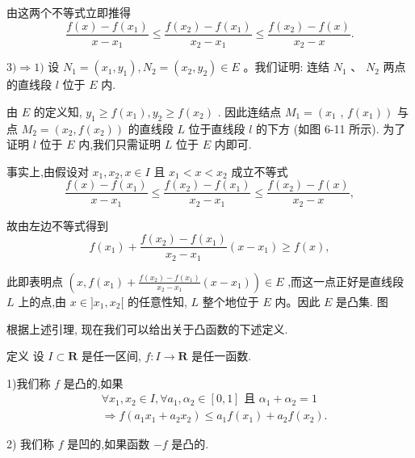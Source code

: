 由这两个不等式立即推得
$$\frac{f\left( x\right)  - f\left( {x}_{1}\right) }{x - {x}_{1}} \leq  \frac{f\left( {x}_{2}\right)  - f\left( {x}_{1}\right) }{{x}_{2} - {x}_{1}} \leq  \frac{f\left( {x}_{2}\right)  - f\left( x\right) }{{x}_{2} - x}.$$

$3) \Rightarrow  1)$ 设 ${N}_{1} = \left( {{x}_{1},{y}_{1}}\right) ,{N}_{2} = \left( {{x}_{2},{y}_{2}}\right)  \in  E$ 。我们证明: 连结 ${N}_{1}\text{ 、 }{N}_{2}$ 两点的直线段 $l$ 位于 $E$ 内.

由 $E$ 的定义知, ${y}_{1} \geq  f\left( {x}_{1}\right) ,{y}_{2} \geq  f\left( {x}_{2}\right)$ . 因此连结点 ${M}_{1} = \left( {x}_{1}\right.$ , $\left. {f\left( {x}_{1}\right) }\right)$ 与点 ${M}_{2} = \left( {{x}_{2},f\left( {x}_{2}\right) }\right)$ 的直线段 $L$ 位于直线段 $l$ 的下方 (如图 6-11 所示). 为了证明 $l$ 位于 $E$ 内,我们只需证明 $L$ 位于 $E$ 内即可.

事实上,由假设对 ${x}_{1},{x}_{2},x \in  I$ 且 ${x}_{1} < x < {x}_{2}$ 成立不等式
$$\frac{f\left( x\right)  - f\left( {x}_{1}\right) }{x - {x}_{1}} \leq  \frac{f\left( {x}_{2}\right)  - f\left( {x}_{1}\right) }{{x}_{2} - {x}_{1}} \leq  \frac{f\left( {x}_{2}\right)  - f\left( x\right) }{{x}_{2} - x},$$

故由左边不等式得到
$$f\left( {x}_{1}\right)  + \frac{f\left( {x}_{2}\right)  - f\left( {x}_{1}\right) }{{x}_{2} - {x}_{1}}\left( {x - {x}_{1}}\right)  \geq  f\left( x\right) ,$$

此即表明点 $\left( {x,f\left( {x}_{1}\right)  + \frac{f\left( {x}_{2}\right)  - f\left( {x}_{1}\right) }{{x}_{2} - {x}_{1}}\left( {x - {x}_{1}}\right) }\right)  \in  E$ ,而这一点正好是直线段 $L$ 上的点,由 $x \in  \rbrack {x}_{1},{x}_{2}\lbrack$ 的任意性知, $L$ 整个地位于 $E$ 内。因此 $E$ 是凸集. 图

根据上述引理, 现在我们可以给出关于凸函数的下述定义.

定义 设 $I \subset  \mathbf{R}$ 是任一区间, $f : I \rightarrow  \mathbf{R}$ 是任一函数.

1)我们称 $f$ 是凸的,如果
\begin{align*}
	&\forall {x}_{1},{x}_{2} \in  I,\forall {a}_{1},{\alpha }_{2} \in  \left\lbrack  {0,1}\right\rbrack  \text{ 且 }{\alpha }_{1} + {\alpha }_{2} = 1\\
	&\Rightarrow  f\left( {{a}_{1}{x}_{1} + {a}_{2}{x}_{2}}\right)  \leq  {a}_{1}f\left( {x}_{1}\right)  + {a}_{2}f\left( {x}_{2}\right) .
\end{align*}

2) 我们称 $f$ 是凹的,如果函数 $- f$ 是凸的.


